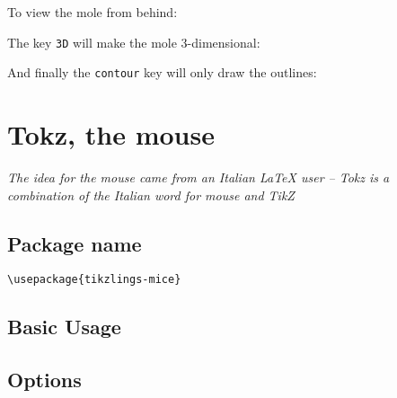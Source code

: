\documentclass[parskip=half]{scrartcl}
\newcommand{\TikZ}{Ti\emph{k}Z\xspace}
\begin{document}
\begin{tcblisting}{}
\moles[hands=red]
\end{tcblisting}

\begin{tcblisting}{}
\moles[feet=red]
\end{tcblisting}

To view the mole from behind:
\begin{tcblisting}{}
\moles[back]
\end{tcblisting}

The key \lstinline|3D| will make the mole 3-dimensional:
\begin{tcblisting}{}
\moles[3D]
\end{tcblisting}

And finally the \lstinline|contour| key will only draw the outlines:
\begin{tcblisting}{}
\moles[contour=black]
\end{tcblisting}

%
%
\clearpage
\section[Mouse]{Tokz, the mouse}

\emph{The idea for the mouse came from an Italian \LaTeX{} user -- Tokz is a combination of the Italian word for mouse and \TikZ}

\subsection{Package name}

\begin{tcolorbox}[lower separated=false, lefthand width=.8\linewidth]
\vspace*{0.5cm}
\lstinline|\usepackage{tikzlings-mice}| 
\vspace*{0.5cm}
\end{tcolorbox}

\subsection{Basic Usage}

\begin{tcblisting}{}
\mouse
\end{tcblisting}

\subsection{Options}
\end{document}
